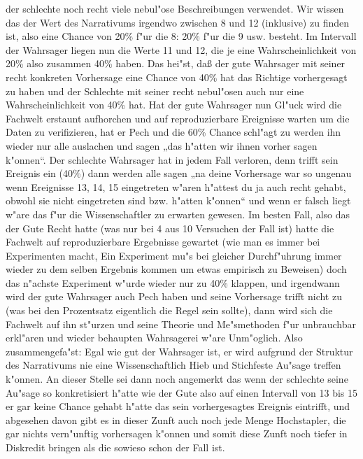 \documentclass[a5paper,8pt]{book}
\begin{document}
der schlechte noch recht viele nebul"ose Beschreibungen verwendet. Wir wissen das der Wert des Narrativums irgendwo zwischen 8 und 12 (inklusive) 
zu finden ist, also eine Chance von 20\% f"ur die 8: 20\% f"ur die 9 usw. besteht. Im Intervall der Wahrsager liegen nun die Werte 11 und 12, die 
je eine Wahrscheinlichkeit von 20\% also zusammen 40\% haben. Das hei"st, daß der gute Wahrsager mit seiner recht konkreten Vorhersage eine Chance 
von 40\% hat das Richtige vorhergesagt zu haben und der Schlechte mit seiner recht nebul"osen auch nur eine Wahrscheinlichkeit von 40\% hat. Hat 
der gute Wahrsager nun Gl"uck wird die Fachwelt erstaunt aufhorchen und auf reproduzierbare Ereignisse warten um die Daten zu verifizieren, hat 
er Pech und die 60\% Chance schl"agt zu werden ihn wieder nur alle auslachen und sagen „das h"atten wir ihnen vorher sagen k"onnen“. Der schlechte 
Wahrsager hat in jedem Fall verloren, denn trifft sein Ereignis ein (40\%) dann werden alle sagen „na deine Vorhersage war so ungenau wenn Ereignisse 
13, 14, 15 eingetreten w"aren h"attest du ja auch recht gehabt, obwohl sie nicht eingetreten sind bzw. h"atten k"onnen“ und wenn er falsch liegt 
w"are das f"ur die Wissenschaftler zu erwarten gewesen. Im besten Fall, also das der Gute Recht hatte (was nur bei 4 aus 10 Versuchen der Fall ist) 
hatte die Fachwelt auf reproduzierbare Ergebnisse gewartet (wie man es immer bei Experimenten macht, Ein Experiment mu"s bei gleicher Durchf"uhrung 
immer wieder zu dem selben Ergebnis kommen um etwas empirisch zu Beweisen) doch das n"achste Experiment w"urde wieder nur zu 40\% klappen, und 
irgendwann wird der gute Wahrsager auch Pech haben und seine Vorhersage trifft nicht zu (was bei den Prozentsatz eigentlich die Regel sein sollte), 
dann wird sich die Fachwelt auf ihn st"urzen und seine Theorie und Me"smethoden f"ur unbrauchbar erkl"aren und wieder behaupten Wahrsagerei w"are Unm"oglich. 
Also zusammengefa"st: Egal wie gut der Wahrsager ist, er wird aufgrund der Struktur des Narrativums nie eine Wissenschaftlich Hieb und Stichfeste 
Au"sage treffen k"onnen. An dieser Stelle sei dann noch angemerkt das wenn der schlechte seine Au"sage so konkretisiert h"atte wie der Gute also auf 
einen Intervall von 13 bis 15 er gar keine Chance gehabt h"atte das sein vorhergesagtes Ereignis eintrifft, und abgesehen davon gibt es in dieser 
Zunft auch noch jede Menge Hochstapler, die gar nichts vern"unftig vorhersagen k"onnen und somit diese Zunft noch tiefer in Diskredit bringen 
als die sowieso schon der Fall ist.\\
\end{document}
